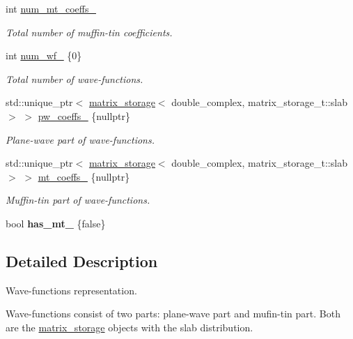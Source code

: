 \begin{DoxyCompactItemize}
\item 
int \hyperlink{classsddk_1_1wave__functions_a03d0c959aba40ede728a48265e5f5614}{num\+\_\+mt\+\_\+coeffs\+\_\+}
\begin{DoxyCompactList}\small\item\em Total number of muffin-\/tin coefficients. \end{DoxyCompactList}\item 
int \hyperlink{classsddk_1_1wave__functions_aaf6c5919b9e7f96cf471af81bcf5e5cf}{num\+\_\+wf\+\_\+} \{0\}
\begin{DoxyCompactList}\small\item\em Total number of wave-\/functions. \end{DoxyCompactList}\item 
std\+::unique\+\_\+ptr$<$ \hyperlink{classsddk_1_1matrix__storage}{matrix\+\_\+storage}$<$ double\+\_\+complex, matrix\+\_\+storage\+\_\+t\+::slab $>$ $>$ \hyperlink{classsddk_1_1wave__functions_ab9f23505c1321afdc8adf023b9631b55}{pw\+\_\+coeffs\+\_\+} \{nullptr\}
\begin{DoxyCompactList}\small\item\em Plane-\/wave part of wave-\/functions. \end{DoxyCompactList}\item 
std\+::unique\+\_\+ptr$<$ \hyperlink{classsddk_1_1matrix__storage}{matrix\+\_\+storage}$<$ double\+\_\+complex, matrix\+\_\+storage\+\_\+t\+::slab $>$ $>$ \hyperlink{classsddk_1_1wave__functions_ae32793eca8637e1e616072311f1b2647}{mt\+\_\+coeffs\+\_\+} \{nullptr\}
\begin{DoxyCompactList}\small\item\em Muffin-\/tin part of wave-\/functions. \end{DoxyCompactList}\item 
\hypertarget{classsddk_1_1wave__functions_a3ccceea729822c012e610d62431faa1a}{}bool {\bfseries has\+\_\+mt\+\_\+} \{false\}\label{classsddk_1_1wave__functions_a3ccceea729822c012e610d62431faa1a}

\end{DoxyCompactItemize}


\subsection{Detailed Description}
Wave-\/functions representation. 

Wave-\/functions consist of two parts\+: plane-\/wave part and mufin-\/tin part. Both are the \hyperlink{classsddk_1_1matrix__storage}{matrix\+\_\+storage} objects with the slab distribution. 

